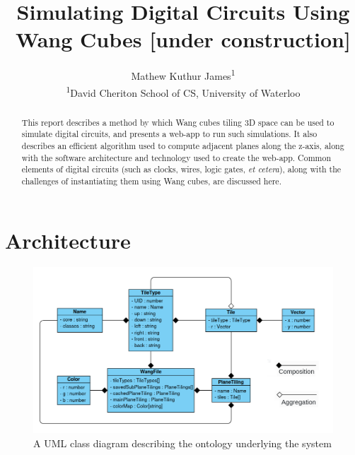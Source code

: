 \documentclass[letterpaper,11pt]{article}
\title{Simulating Digital Circuits Using Wang Cubes [under construction]}
\author{Mathew Kuthur James\textsuperscript{1}
\vspace{10pt}\\
\textsuperscript{1}David Cheriton School of CS, University of Waterloo} %
\date{}					%
\begin{document}
\maketitle

\thispagestyle{empty}

\begin{abstract}

This report describes a method by which Wang cubes tiling 3D space can be used to simulate digital circuits, and presents a web-app to run such simulations. It also describes an efficient algorithm used to compute adjacent planes along the z-axis, along with the software architecture and technology used to create the web-app. Common elements of digital circuits (such as clocks, wires, logic gates, \emph{et cetera}), along with the challenges of instantiating them using Wang cubes, are discussed here.

\end{abstract}



\section*{Architecture}

\begin{figure}[h!tbp]
	\centering
	\includegraphics[width=6.4in]{figures/class-diagram.png}
	\caption{A UML class diagram describing the ontology underlying the system}
	\label{fig:1}
\end{figure}
\end{document}
